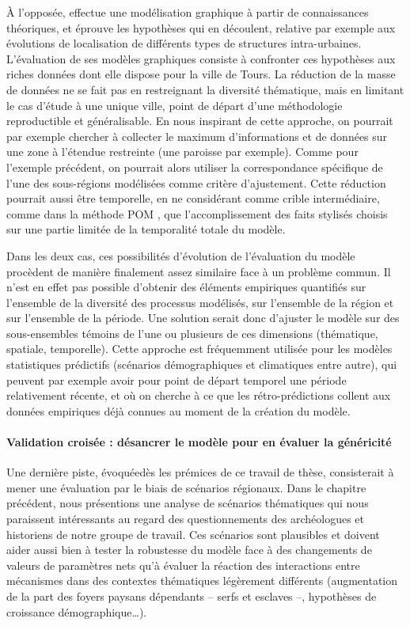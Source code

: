 \noindent À l'opposée, \textcite{nahassia_formes_2019} effectue une modélisation graphique à partir de connaissances théoriques, et éprouve les hypothèses qui en découlent, relative par exemple aux évolutions de localisation de différents types de structures intra-urbaines.
L'évaluation de ses modèles graphiques consiste à confronter ces hypothèses aux riches données dont elle dispose pour la ville de Tours.
La réduction de la masse de données ne se fait pas en restreignant la diversité thématique, mais en limitant le cas d'étude à une unique ville, point de départ d'une méthodologie reproductible et généralisable.
En nous inspirant de cette approche, on pourrait par exemple chercher à collecter le maximum d'informations et de données sur une zone à l'étendue restreinte (une paroisse par exemple).
Comme pour l'exemple précédent, on pourrait alors utiliser la correspondance spécifique de l'une des sous-régions modélisées comme critère d'ajustement.
Cette réduction pourrait aussi être temporelle, en ne considérant comme \og crible intermédiaire\fg{}, comme dans la méthode POM \autocite{grimm_pattern-oriented_2005,grimm_pattern-oriented_2012}, que l'accomplissement des faits stylisés choisis sur une partie limitée de la temporalité totale du modèle.

\noindent Dans les deux cas, ces possibilités d'évolution de l'évaluation du modèle procèdent de manière finalement assez similaire face à un problème commun.
Il n'est en effet pas possible d'obtenir des éléments empiriques quantifiés sur l'ensemble de la diversité des processus modélisés, sur l'ensemble de la région et sur l'ensemble de la période.
Une solution serait donc d'ajuster le modèle sur des sous-ensembles témoins de l'une ou plusieurs de ces dimensions (thématique, spatiale, temporelle).
Cette approche est fréquemment utilisée pour les modèles statistiques prédictifs (scénarios démographiques et climatiques entre autre), qui peuvent par exemple avoir pour point de départ temporel une période relativement récente, et où on cherche à ce que les \og rétro-prédictions\fg{} collent aux données empiriques déjà connues au moment de la création du modèle.


\paragraph{Validation croisée : désancrer le modèle pour en évaluer la généricité}\label{par:validation-croisee}
Une dernière piste, évoquée\noindent  dès les prémices de ce travail de thèse, consisterait à mener une évaluation par le biais de \og scénarios régionaux\fg{}.
Dans le chapitre précédent, nous présentions une analyse de scénarios thématiques qui nous paraissent intéressants au regard des questionnements des archéologues et historiens de notre groupe de travail.
Ces scénarios sont plausibles et doivent aider aussi bien à tester la robustesse du modèle face à des changements de valeurs de paramètres nets qu'à évaluer la réaction des interactions entre mécanismes dans des contextes thématiques légèrement différents (augmentation de la part des foyers paysans dépendants -- serfs et esclaves --, hypothèses de croissance démographique\ldots).


